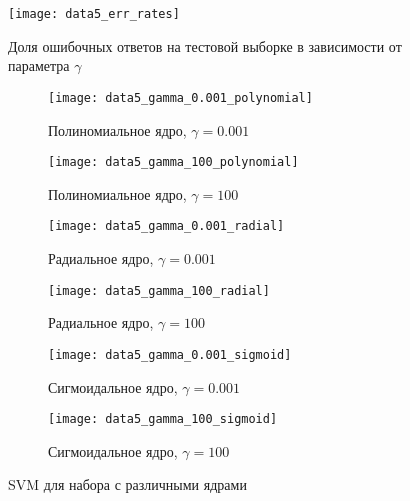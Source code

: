 \documentclass[a4paper,12pt]{article} %
\newcommand{\myPictWidth}{.95\textwidth}
\begin{document}
\begin{figure}[H]
    \centering \texttt{[image: data5\_err\_rates]}
    \caption{Доля ошибочных ответов на тестовой выборке в зависимости от параметра $\gamma$}
    \label{fig:data5_err}
\end{figure}

\begin{figure}[H]
    \centering
    \begin{subfigure}{.5\textwidth}
        \centering
        \texttt{[image: data5\_gamma\_0.001\_polynomial]}
        \caption{Полиномиальное ядро, $ \gamma = 0.001 $}
        \label{fig:data5_polynomial}
    \end{subfigure}%
    \begin{subfigure}{.5\textwidth}
        \centering
        \texttt{[image: data5\_gamma\_100\_polynomial]}
        \caption{Полиномиальное ядро, $ \gamma = 100 $}
        \label{fig:data5_polynomial1}
    \end{subfigure}

    \begin{subfigure}{.5\textwidth}
        \centering
        \texttt{[image: data5\_gamma\_0.001\_radial]}
        \caption{Радиальное ядро, $ \gamma = 0.001 $}
        \label{fig:data5_radial}
    \end{subfigure}%
    \begin{subfigure}{.5\textwidth}
        \centering
        \texttt{[image: data5\_gamma\_100\_radial]}
        \caption{Радиальное ядро, $ \gamma = 100 $}
        \label{fig:data5_radial1}
    \end{subfigure}

    \begin{subfigure}{.5\textwidth}
        \centering
        \texttt{[image: data5\_gamma\_0.001\_sigmoid]}
        \caption{Сигмоидальное ядро, $ \gamma = 0.001 $}
        \label{fig:data5_sigmoid}
    \end{subfigure}%
    \begin{subfigure}{.5\textwidth}
        \centering
        \texttt{[image: data5\_gamma\_100\_sigmoid]}
        \caption{Сигмоидальное ядро, $ \gamma = 100 $}
        \label{fig:data5_sigmoid1}
    \end{subfigure}

    \caption{SVM для набора  с различными ядрами}
    \label{fig:5}
\end{figure}
\end{document}
